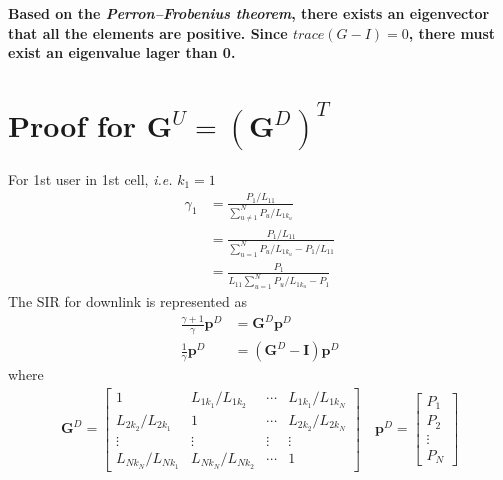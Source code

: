 \documentclass[12pt]{article}
\begin{document}
\textbf{Based on the \textit{Perron–Frobenius theorem}, there exists an eigenvector that all the elements are positive. Since $trace(G-I)=0$, there must exist an eigenvalue lager than 0.}

\section{Proof for $\bm{G}^U = (\bm{G}^D)^T$}
 For 1st user in 1st cell, \textit{i.e.} $k_1=1$
\begin{align}\label{gammaD}
\gamma_1 &= \frac{P_1/L_{11}}{\sum_{u\neq 1}^{N}P_{u}/L_{1k_u}} \nonumber\\
&=\frac{P_1/L_{11}}{\sum_{u=1}^{N}P_{u}/L_{1k_u} - P_1/L_{11}} \nonumber\\
&= \frac{P_1}{L_{11}\sum_{u=1}^{N}P_{u}/L_{1k_u} - P_1} 
\end{align}
The SIR for downlink is represented as
\begin{align}
\frac{\gamma+1}{\gamma}\bm{p}^D &= \bm{G}^D\bm{p}^D\\
\frac{1}{\gamma}\bm{p}^D &= (\bm{G}^D-\bm{I})\bm{p}^D
\end{align}
where 
\begin{align}
\bm{G}^D = 
\begin{bmatrix}
1& L_{1k_1}/L_{1k_2}&\cdots& L_{1k_1}/L_{1k_N}\\
L_{2k_2}/L_{2k_1}& 1&\cdots& L_{2k_2}/L_{2k_N}\\
\vdots&\vdots&\vdots&\vdots\\
L_{Nk_N}/L_{Nk_1}& L_{Nk_N}/L_{Nk_2}&\cdots& 1
\end{bmatrix}
\quad
\bm{p}^D =
\begin{bmatrix}
P_{1}\\
P_{2}\\
\vdots\\
P_N
\end{bmatrix}
\end{align}
%
%
\end{document}
